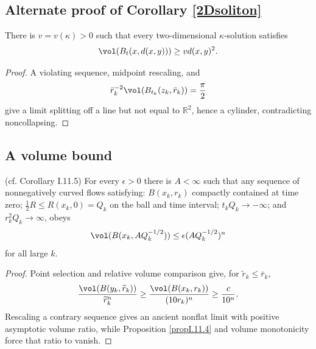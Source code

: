 \subsection{Alternate proof of Corollary \ref{2Dsoliton}}
\label{altpf11.3}
\begin{lemma}
\label{lem:kl-alternate-proof-corollary-2dsoliton-using-proposition-propi-11-4-corolla-existence-kappa-solutions}

\label{2dvol}
There is $v=v(\kappa)>0$ such that every two-dimensional $\kappa$-solution
satisfies
\begin{equation}\label{volnotsmall}
\vol(B_t(x,d(x,y)))\geq v d(x,y)^2.
\end{equation}
\end{lemma}
\begin{proof}
\sketch A violating sequence, midpoint rescaling, and
\begin{equation}\label{halfvol}
\bar r_k^{-2}\vol(B_{t_k}(z_k,\bar r_k))=\frac\pi2
\end{equation}
give a limit splitting off a
line but not equal to $\mathbb R^2$, hence a cylinder, contradicting
noncollapsing.
\end{proof}
\subsection{A volume bound}
\begin{corollary}
\label{cor:kl-volume-bound-existence-curvature-operators}

(cf. Corollary I.11.5) \label{corI.11.5}
For every $\epsilon>0$ there is $A<\infty$ such that any sequence of
nonnegatively curved flows satisfying: $B(x_k,r_k)$ compactly contained at
time zero; $\frac12R\leq R(x_k,0)=Q_k$ on the ball and time interval;
$t_kQ_k\to-\infty$; and $r_k^2Q_k\to\infty$, obeys
\[
\vol(B(x_k,AQ_k^{-1/2}))\leq\epsilon(AQ_k^{-1/2})^n
\]
for all large $k$.
\end{corollary}
\begin{proof}
\sketch Point selection and relative volume comparison give, for
$\widetilde r_k\leq\bar r_k$,
\begin{equation}\label{volbig}
\frac{\vol(B(y_k,\widetilde r_k))}{\widetilde r_k^n}
\geq\frac{\vol(B(x_k,r_k))}{(10r_k)^n}\geq\frac{c}{10^n}.
\end{equation}
Rescaling a contrary sequence gives an ancient nonflat limit with
positive asymptotic volume ratio, while Proposition \ref{propI.11.4} and
volume monotonicity force that ratio to vanish.
\end{proof}

